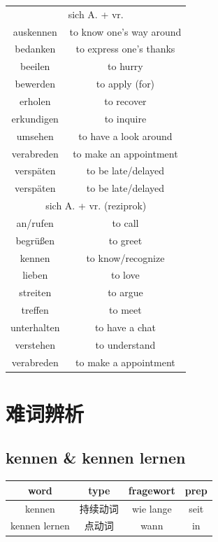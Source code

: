 \begin{center}
\begin{tabular}{|c|c|}
        \hline
        \multicolumn{2}{|c|}{sich A. + vr.}              \\
        auskennen     & to know one's way around         \\
        bedanken      & to express one's thanks          \\
        beeilen       & to hurry                         \\
        bewerden      & to apply (for)                   \\
        erholen       & to recover                       \\
        erkundigen    & to inquire                       \\
        umsehen       & to have a look around            \\
        verabreden    & to make an appointment           \\
        verspäten     & to be late/delayed               \\
        verspäten     & to be late/delayed               \\
        \hline
        \multicolumn{2}{|c|}{sich A. + vr. (reziprok)}   \\
        an/rufen      & to call                          \\
        begrüßen      & to greet                         \\
        kennen        & to know/recognize                \\
        lieben        & to love                          \\
        streiten      & to argue                         \\
        treffen       & to meet                          \\
        unterhalten   & to have a chat                   \\
        verstehen     & to understand                    \\
        verabreden    & to make a appointment            \\
        \hline
    \end{tabular}
\end{center}

\section{难词辨析}

\subsection{kennen \& kennen lernen}
\begin{center}
    \begin{tabular}{|c|c|c|c|}
        \hline
        \rowcolor{gray}
        word          & type & fragewort & prep \\
        \hline
        kennen        & 持续动词 & wie lange & seit \\
        \hline
        kennen lernen & 点动词  & wann      & in   \\
        \hline
    \end{tabular}
\end{center}

